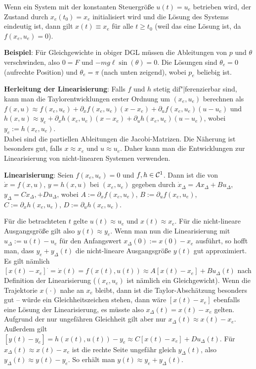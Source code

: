 Wenn ein System mit der konstanten Steuergröße $u(t) = u_e$ betrieben wird,
der Zustand durch $x_e(t_0) = x_e$ initialisiert wird und die Lösung des Systems eindeutig ist,
dann gilt $x(t) \equiv x_e$ für alle $t \ge t_0$
(weil das eine Lösung ist, da $f(x_e, u_e) = 0$).

\textbf{Beispiel}:
Für Gleichgewichte in obiger DGL müssen die Ableitungen von $p$ und $\theta$ verschwinden,
also $0 = F$ und $-mg\ell \sin(\theta) = 0$.
Die Lösungen sind $\theta_e = 0$ (aufrechte Position) und $\theta_e = \pi$ (nach unten zeigend),
wobei $p_e$ beliebig ist.

\linie

\textbf{Herleitung der Linearisierung}:
Falls $f$ und $h$ stetig dif"|ferenzierbar sind, kann man die Taylorentwicklungen erster Ordnung
um $(x_e, u_e)$ berechnen als\\
$f(x, u) \approx f(x_e, u_e) + \partial_x f(x_e, u_e) (x - x_e) +
\partial_u f(x_e, u_e) (u - u_e)$ und\\
$h(x, u) \approx y_e + \partial_x h(x_e, u_e) (x - x_e) +
\partial_u h(x_e, u_e) (u - u_e)$, wobei $y_e := h(x_e, u_e)$.\\
Dabei sind die partiellen Ableitungen die Jacobi-Matrizen.
Die Näherung ist besonders gut, falls $x \approx x_e$ und $u \approx u_e$.
Daher kann man die Entwicklungen zur Linearisierung von nicht-linearen Systemen verwenden.

\textbf{Linearisierung}:
Seien $f(x_e, u_e) = 0$ und $f, h \in \mathcal{C}^1$.
Dann ist die  von $\dot{x} = f(x, u)$, $y = h(x, u)$
bei $(x_e, u_e)$ gegeben durch
$\dot{x}_\Delta = A x_\Delta + B u_\Delta$, $y_\Delta = C x_\Delta, + D u_\Delta$,
wobei $A := \partial_x f(x_e, u_e)$, $B := \partial_u f(x_e, u_e)$,
$C := \partial_x h(x_e, u_e)$, $D := \partial_u h(x_e, u_e)$.

Für die betrachteten $t$ gelte $u(t) \approx u_e$ und $x(t) \approx x_e$.
Für die nicht-lineare Ausgangsgröße gilt also $y(t) \approx y_e$.
Wenn man nun die Linearisierung mit $u_\Delta := u(t) - u_e$ für den Anfangswert
$x_\Delta(0) := x(0) - x_e$ ausführt, so hofft man, dass
$y_e + y_\Delta(t)$ die nicht-lineare Ausgangsgröße $y(t)$ gut approximiert.\\
Es gilt nämlich $\left[x(t) - x_e\right]^\cdot = \dot{x}(t) = f(x(t), u(t)) \approx
A[x(t) - x_e] + Bu_\Delta(t)$ nach Definition der Linearisierung
($(x_e, u_e)$ ist nämlich ein Gleichgewicht).
Wenn die Trajektorie $x(\cdot)$ nahe an $x_e$ bleibt, dann ist die Taylor-Abschätzung
besonders gut -- würde ein Gleichheitszeichen stehen, dann wäre $[x(t) - x_e]$
ebenfalls eine Lösung der Linearisierung, es müsste also $x_\Delta(t) = x(t) - x_e$ gelten.
Aufgrund der nur ungefähren Gleichheit gilt aber nur $x_\Delta(t) \approx x(t) - x_e$.\\
Außerdem gilt $\left[y(t) - y_e\right] = h(x(t), u(t)) - y_e \approx C[x(t) - x_e] + Du_\Delta(t)$.
Für $x_\Delta(t) \approx x(t) - x_e$ ist die rechte Seite ungefähr gleich $y_\Delta(t)$,
also $y_\Delta(t) \approx y(t) - y_e$.
So erhält man $y(t) \approx y_e + y_\Delta(t)$.

